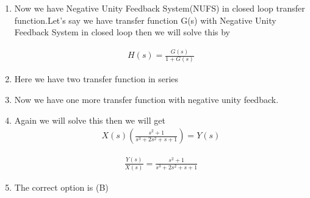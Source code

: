 \begin{enumerate}[label=\thesection.\arabic*.,ref=\thesection.\theenumi]
\item Now we have Negative Unity Feedback System(NUFS) in closed loop transfer function.Let's say we have transfer function G(s) with Negative Unity Feedback System in closed loop then we will solve this by      

\begin{align}
 H(s)=\frac{G(s)}{1+G(s)}
\end{align}


\item Here we have two transfer function in series 

\item Now we have one more transfer function with negative unity feedback.


\item Again we will solve this then we will get
\begin{align}
X(s)(\frac{s^2+1}{s^3+2s^2+s+1})=Y(s)
\end{align}

\begin{align}
\frac{Y(s)}{X(s)}=\frac{s^2+1}{s^3+2s^2+s+1}
\end{align}

\item The correct option is (B)

%
\end{enumerate}